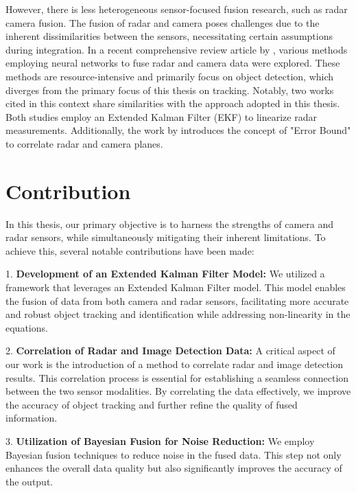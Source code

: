 However, there is less heterogeneous sensor-focused fusion research, such as radar camera fusion.
The fusion of radar and camera poses challenges due to the inherent dissimilarities between the sensors, necessitating certain assumptions during integration.
In a recent comprehensive review article by \citeauthor{Yao_2023}\cite{Yao_2023}, 
various methods employing neural networks to fuse radar and camera data were explored.
These methods are resource-intensive and primarily focus on object detection, 
which diverges from the primary focus of this thesis on tracking. 
Notably, two works cited in this context \cite{8844649}\cite{8932892} share similarities with the approach adopted in this thesis. 
Both studies employ an Extended Kalman Filter (EKF) to linearize radar measurements. 
Additionally, the work by \citeauthor{8844649} introduces the concept of "Error Bound" to correlate radar and camera planes.

\newpage

\section{Contribution}\label{sec:1-contribution}


In this thesis, our primary objective is to harness the strengths of camera and radar sensors, 
while simultaneously mitigating their inherent limitations. To achieve this, several notable contributions have been made:

1. \textbf{Development of an Extended Kalman Filter Model: }
We utilized a framework that leverages an Extended Kalman Filter model. 
This model enables the fusion of data from both camera and radar sensors, 
facilitating more accurate and robust object tracking and identification
 while addressing non-linearity in the equations.

2. \textbf{Correlation of Radar and Image Detection Data: }
A critical aspect of our work is the introduction of a method to correlate radar and image detection results. 
This correlation process is essential for establishing a seamless connection between the two sensor modalities.
By correlating the data effectively, we improve the accuracy of object tracking and further refine the quality of fused information.

3. \textbf{Utilization of Bayesian Fusion for Noise Reduction: }
We employ Bayesian fusion techniques to reduce noise in the fused data.
This step not only enhances the overall data quality but also significantly improves the accuracy of the output. 

